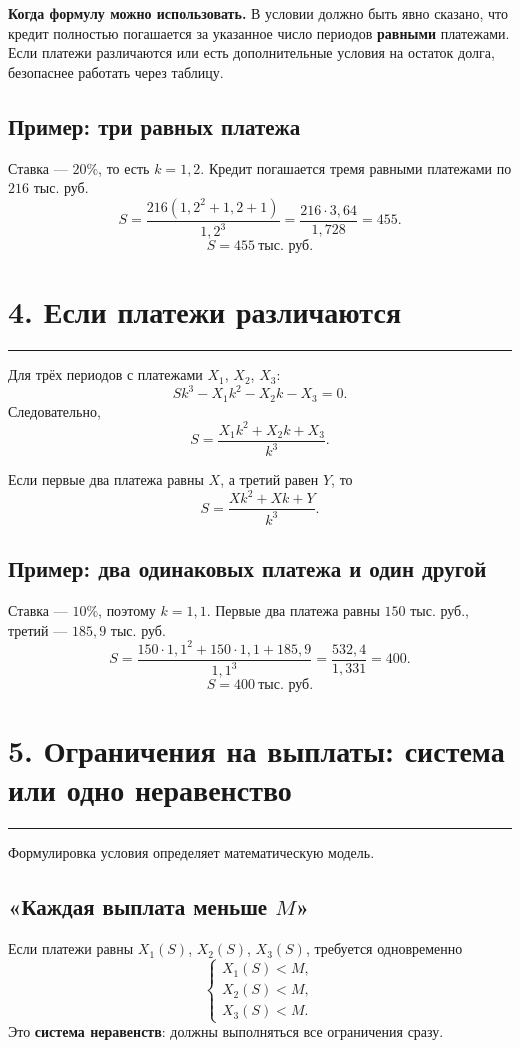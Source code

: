 \documentclass[a4paper,12pt]{article}
\newcommand{\sectionline}{\vspace{-0.4em}\textcolor{linegray}{\rule{\linewidth}{0.5pt}}\vspace{0.35em}}
\newcommand{\key}[1]{\textcolor{darkaccent}{\textbf{#1}}}
\begin{document}
\key{Когда формулу можно использовать.} В условии должно быть явно сказано, что кредит полностью погашается за указанное число периодов \textbf{равными} платежами. Если платежи различаются или есть дополнительные условия на остаток долга, безопаснее работать через таблицу.

\subsection*{Пример: три равных платежа}
Ставка --- $20\%$, то есть $k=1{,}2$. Кредит погашается тремя равными платежами по $216$ тыс. руб.
\[
S=\frac{216(1{,}2^2+1{,}2+1)}{1{,}2^3}
=\frac{216\cdot3{,}64}{1{,}728}=455.
\]
\[
\boxed{S=455\ \text{тыс. руб.}}
\]

\section*{4. Если платежи различаются}
\sectionline

Для трёх периодов с платежами $X_1$, $X_2$, $X_3$:
\[
\boxed{Sk^3-X_1k^2-X_2k-X_3=0.}
\]
Следовательно,
\[
\boxed{S=\frac{X_1k^2+X_2k+X_3}{k^3}.}
\]

Если первые два платежа равны $X$, а третий равен $Y$, то
\[
\boxed{S=\frac{Xk^2+Xk+Y}{k^3}.}
\]

\subsection*{Пример: два одинаковых платежа и один другой}
Ставка --- $10\%$, поэтому $k=1{,}1$. Первые два платежа равны $150$ тыс. руб., третий --- $185{,}9$ тыс. руб.
\[
S=\frac{150\cdot1{,}1^2+150\cdot1{,}1+185{,}9}{1{,}1^3}
=\frac{532{,}4}{1{,}331}=400.
\]
\[
\boxed{S=400\ \text{тыс. руб.}}
\]

\clearpage

\section*{5. Ограничения на выплаты: система или одно неравенство}
\sectionline

Формулировка условия определяет математическую модель.

\subsection*{«Каждая выплата меньше $M$»}
Если платежи равны $X_1(S)$, $X_2(S)$, $X_3(S)$, требуется одновременно
\[
\begin{cases}
X_1(S)<M,\\
X_2(S)<M,\\
X_3(S)<M.
\end{cases}
\]
Это \key{система неравенств}: должны выполняться все ограничения сразу.
\end{document}
